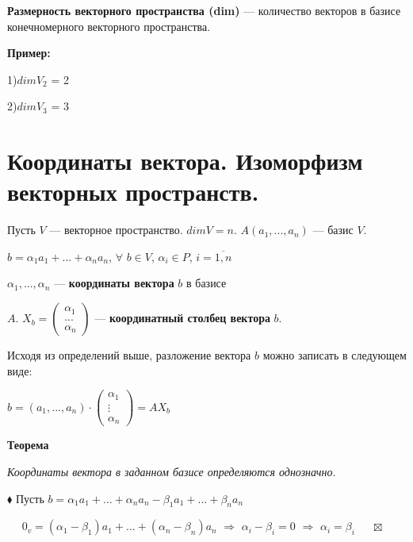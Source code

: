 \documentclass[a4paper, 12pt]{report}
\begin{document}
	\par\bigskip
	{\textbf{ Размерность векторного пространства (dim)} --- количество векторов в базисе конечномерного векторного пространства.
		
		\par\bigskip
		\textbf{Пример:}
		
		1)$dim V_2$ = 2
		
		2)$dim V_3$ = 3
		
		
		
		
		
		
		
		
		
		
		\section{Координаты вектора. Изоморфизм векторных пространств.}
		
		
		\quad\; Пусть $V$ --- векторное пространство. $dim V = n$. $A(a_1, ..., a_n)$ --- базис $V$.
		
		$b = \alpha_1a_1 + ... + \alpha_na_n$, $\forall$ $b \in V$, $\alpha_i \in P$, $i=\overline{1, n}$
		
		$\alpha_1,...,\alpha_n$ --- \textbf{координаты вектора} $b$ в базисе} $A$. $X_b = \begin{pmatrix} \alpha_1 \\ ... \\ \alpha_n \end{pmatrix}$ --- \textbf{координатный столбец вектора} $b$.
	
	Исходя из определений выше, разложение вектора $b$ можно записать в следующем виде:
	
	$b = (a_1, ..., a_n)\cdot\begin{pmatrix} \alpha_1 \\ \vdots \\ \alpha_n \end{pmatrix} = AX_b$
	
	\par\bigskip
	\textbf{Теорема}
	
	\textit{Координаты вектора в заданном базисе определяются однозначно}.
	\par\bigskip
	$\blacklozenge$ Пусть $b = \alpha_1a_1 + ... + \alpha_na_n - \beta_1a_1 + ... + \beta_na_n$
	
	$\quad$ $0_v = (\alpha_1 - \beta_1)a_1 + ... + (\alpha_n - \beta_n)a_n$ $\Rightarrow$ $\alpha_i - \beta_i = 0$ $\Rightarrow$ $\alpha_i = \beta_i$
	$\quad$ $\boxtimes$
	
\end{document}

